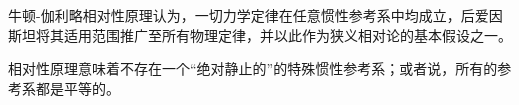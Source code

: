
牛顿-伽利略相对性原理认为，一切力学定律在任意惯性参考系中均成立，后爱因斯坦将其适用范围推广至所有物理定律，并以此作为狭义相对论的基本假设之一。

相对性原理意味着不存在一个“绝对静止的”的特殊惯性参考系；或者说，所有的参考系都是平等的。